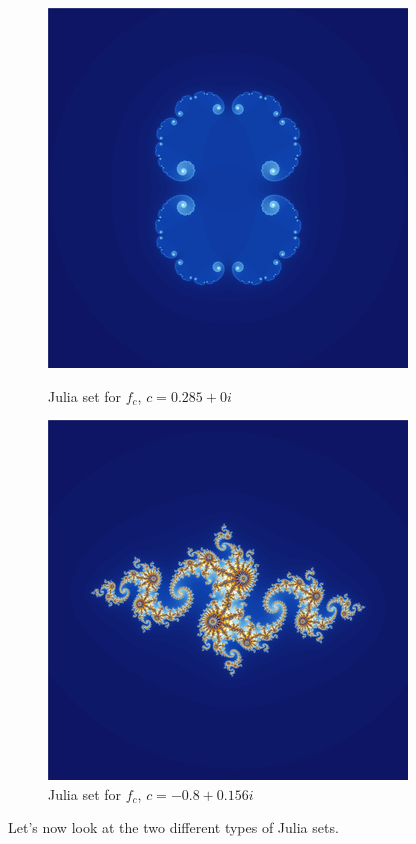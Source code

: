 \documentclass[a4paper,11pt]{article}
\theoremstyle{definition}
\numberwithin{equation}{section} %
\begin{document}
\begin{figure}[h]
    \centering
    \begin{minipage}{.5\textwidth}
        \centering
        \includegraphics[width=.5\linewidth]{figures/Julia_0.285_0.png}
        \caption[width=.2\textwidth]{Julia set for $f_c$, $c =  0.285 + 0i$}
        \label{fig:Julia_ex_1}
    \end{minipage}%
    \begin{minipage}{.5\textwidth}
        \centering
        \includegraphics[width=.5\linewidth]{figures/Julia_-0.8_0.156.png}
        \caption[width=.2\textwidth]{Julia set for $f_c$, $c = -0.8 + 0.156i$}
        \label{fig:Julia_ex_2}
    \end{minipage}
\end{figure}



Let's now look at the two different types of Julia sets.
\end{document}
